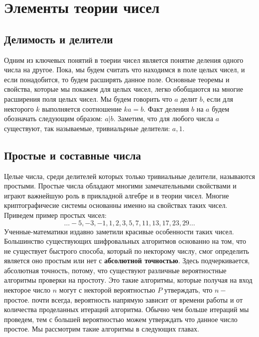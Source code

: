 \chapter{Элементы теории чисел}
\section{Делимость и делители}

Одним из ключевых понятий в тоерии чисел является понятие деления одного числа на другое. Пока, мы будем считать что находимся в поле целых чисел, и если понадобится, то будем расширять данное поле. Основные теоремы и свойства, которые мы покажем для целых чисел, легко обобщаются на многие расширения поля целых чисел. Мы будем говорить что $a$ делит $b$, если для некторого $k$ выполняется соотношение $ka=b$. 
Факт деления $b$ на $a$ будем обозначать следующим образом: $a|b$.
Заметим, что для любого числа $a$ существуют, так называемые, тривиальрные делители: \textbf{$a, 1$}.
\section{Простые и составные числа}
Целые числа, среди делителей которых только тривиальные делители, называются простыми. Простые числа обладают многими замечательными свойствами и играют важнейшую роль в прикладной алгебре и в теории чисел. Многие криптографичесие системы основанны именно на свойствах таких чисел.
Приведем пример простых чисел:
$$\ldots -5, -3, -1, 1, 2, 3, 5, 7, 11, 13, 17, 23, 29 \ldots$$
Ученные-математики издавно заметили красивые особенности таких чисел. Большинство существующих шифровальных алгоритмов основанно на том, что не существует быстрого способа, который по некторому числу, смог определить является оно простым или нет с \textbf{абсолютной точностью}. Здесь подчеркивается, абсолютная точность, потому, что существуют различные вероятностные алгоритмы проверки на простоту. Это такие алгоритмы, которые получая на вход некторое число $n$ могут с некторой вероятностью $P$ утверждать, что $n -$ простое. почти всегда, вероятность напрямую зависит от времени работы и от количества проделанных итераций алгоритма. Обычно чем больше итераций мы проведем, тем с большей вероятностью можем утверждать что данное число простое. Мы рассмотрим такие алгоритмы в следующих главах.

